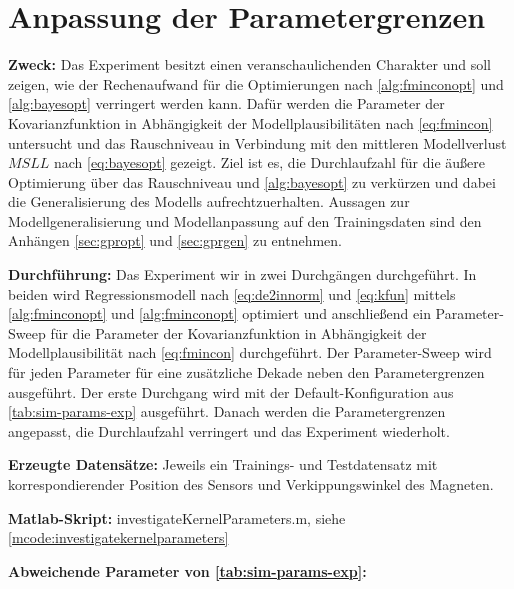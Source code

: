 %

\section{Anpassung der Parametergrenzen}\label{sec:exp4}

\textbf{Zweck:} Das Experiment besitzt einen veranschaulichenden Charakter und soll zeigen, wie der Rechenaufwand für die Optimierungen nach \autoref{alg:fminconopt} und \autoref{alg:bayesopt} verringert werden kann. Dafür werden die Parameter der Kovarianzfunktion in Abhängigkeit der Modellplausibilitäten nach \autoref{eq:fmincon} untersucht und das Rauschniveau in Verbindung mit den mittleren Modellverlust $MSLL$ nach \autoref{eq:bayesopt} gezeigt. Ziel ist es, die Durchlaufzahl für die äußere Optimierung über das Rauschniveau und \autoref{alg:bayesopt} zu verkürzen und dabei die Generalisierung des Modells aufrechtzuerhalten.
Aussagen zur Modellgeneralisierung und Modellanpassung auf den Trainingsdaten sind den Anhängen \autoref{sec:gpropt} und \autoref{sec:gprgen} zu entnehmen.

\textbf{Durchführung:} Das Experiment wir in zwei Durchgängen durchgeführt. In beiden wird Regressionsmodell nach \autoref{eq:de2innorm} und \autoref{eq:kfun} mittels \autoref{alg:fminconopt} und \autoref{alg:fminconopt} optimiert und anschließend ein Parameter-Sweep für die Parameter der Kovarianzfunktion in Abhängigkeit der Modellplausibilität nach \autoref{eq:fmincon} durchgeführt. Der Parameter-Sweep wird für jeden Parameter für eine zusätzliche Dekade neben den Parametergrenzen ausgeführt. Der erste Durchgang wird mit der Default-Konfiguration aus \autoref{tab:sim-params-exp} ausgeführt. Danach werden die Parametergrenzen angepasst, die Durchlaufzahl verringert und das Experiment wiederholt.

\textbf{Erzeugte Datensätze:} Jeweils ein Trainings- und Testdatensatz mit korrespondierender Position des Sensors und Verkippungswinkel des Magneten.

\textbf{Matlab-Skript:} investigateKernelParameters.m, siehe \autoref{mcode:investigatekernelparameters}

\textbf{Abweichende Parameter von \autoref{tab:sim-params-exp}:}


